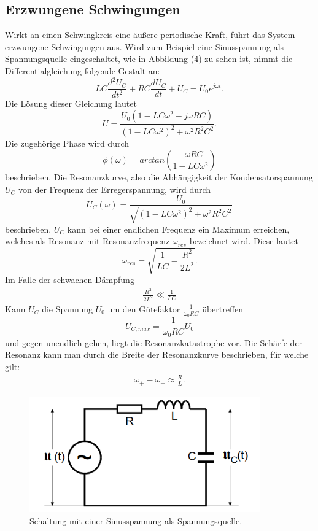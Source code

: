 \subsection{Erzwungene Schwingungen}
Wirkt an einen Schwingkreis eine äußere periodische Kraft, führt das System erzwungene Schwingungen aus.
Wird zum Beispiel eine Sinusspannung als Spannungsquelle eingeschaltet, wie in Abbildung (4) zu sehen ist,
nimmt die Differentialgleichung folgende Gestalt an:
\begin{equation}
LC\frac{d^2 U_C}{dt^2} + RC\frac{d U_C}{dt} + U_C = U_0 e^{j\omega t} .
\end{equation}
Die Lösung dieser Gleichung lautet
\begin{equation}
U = \frac{U_0(1-LC\omega^2 - j\omega RC)}{(1-LC\omega^2)^2 + \omega^2 R^2 C^2} .
\end{equation}
Die zugehörige Phase wird durch 
\begin{equation}
\phi(\omega) = arctan(\frac{-\omega RC}{1-LC\omega^2})
\end{equation}
beschrieben.
Die Resonanzkurve, also die Abhängigkeit der Kondensatorspannung $U_C$ von der Frequenz der Erregerspannung, wird durch
\begin{equation}
U_C(\omega) = \frac{U_0}{\sqrt{(1-LC\omega^2)^2 + \omega^2 R^2 C^2}}
\end{equation}
beschrieben. $U_C$ kann bei einer endlichen Frequenz ein Maximum erreichen, welches als Resonanz mit Resonanzfrequenz $\omega_{res}$ bezeichnet wird.
Diese lautet
\begin{equation}
\omega_{res} = \sqrt{\frac{1}{LC} - \frac{R^2}{2L^2}} .
\end{equation}
Im Falle der schwachen Dämpfung
\begin{align*}
\frac{R^2}{2L^2} \ll \frac{1}{LC}
\end{align*}
Kann $U_C$ die Spannung $U_0$ um den Gütefaktor $\frac{1}{\omega_0 RC}$ übertreffen 
\begin{equation}
U_{C,max} = \frac{1}{\omega_0 RC}U_0
\end{equation}
und gegen unendlich gehen, liegt die Resonanzkatastrophe vor.
Die Schärfe der Resonanz kann man durch die Breite der Resonanzkurve beschrieben, für welche gilt:
\begin{align*}
\omega _+ - \omega _- \approx \frac{R}{L} .
\end{align*}
\begin{figure}[H]
  \centering
  \includegraphics[height=5cm]{erzwungen.png}
  \caption{Schaltung mit einer Sinusspannung als Spannungsquelle. \cite[S.6]{kent}}
\end{figure}
